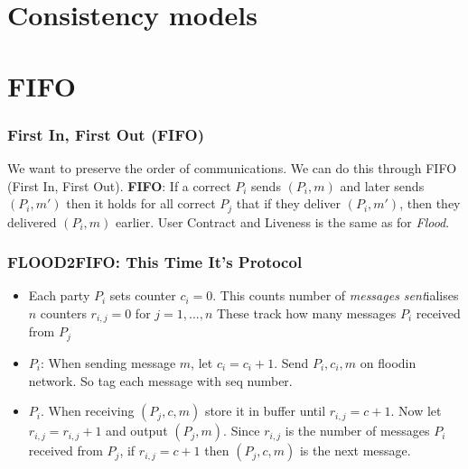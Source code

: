 \section{Consistency models}
\section{FIFO}
    \begin{frame}
        \frametitle{First In, First Out (FIFO)}
            We want to preserve the order of communications. We can do this through FIFO (First In, First Out). 
            \textbf{FIFO}: If a correct $P_i$ sends $(P_i, m)$ and later sends $(P_i, m')$ then it holds for all correct $P_j$ that if they deliver $(P_i, m')$, then they delivered $(P_i, m)$ earlier. 
            User Contract and Liveness is the same as for \textit{Flood}. 
    \end{frame}
    \begin{frame}
        \frametitle{FLOOD2FIFO: This Time It's Protocol}
            \begin{itemize}
                \item Each party $P_i$ sets counter $c_i = 0$. This counts number of \textit{messages sent}ialises $n$ counters $r_{i, j} = 0$ for $j = 1, ..., n$ These track how many messages $P_i$ received from $P_j$
                \item $P_i$: When sending message $m$, let $c_i = c_i + 1$. Send $P_i, c_i, m$ on floodin network. So tag each message with seq number.
                \item $P_i$. When receiving $(P_j, c, m)$ store it in buffer until $r_{i, j} = c + 1$. Now let $r_{i, j} = r_{i, j} + 1$ and output $(P_j, m)$. Since $r_{i, j}$ is the number of messages $P_i$ received from $P_j$, if $r_{i, j} = c + 1$ then $(P_j, c, m)$ is the next message. 
            \end{itemize}
    \end{frame}


